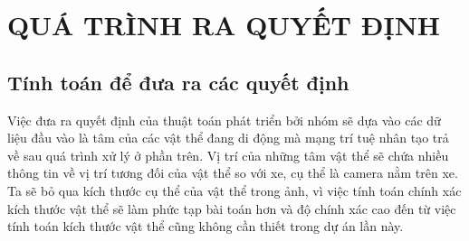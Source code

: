 \chapter {QUÁ TRÌNH RA QUYẾT ĐỊNH}


\section{Tính toán để đưa ra các quyết định}
	Việc đưa ra quyết định của thuật toán phát triển bởi nhóm sẽ dựa vào các dữ liệu đầu vào là tâm của các vật thể đang di động mà mạng trí tuệ nhân tạo trả về sau quá trình xử lý ở phần trên. Vị trí của những tâm vật thể sẽ chứa nhiều thông tin về vị trí tương đối của vật thể so với xe, cụ thể là camera nằm trên xe. Ta sẽ bỏ qua kích thước cụ thể của vật thể trong ảnh, vì việc tính toán chính xác kích thước vật thể sẽ làm phức tạp bài toán hơn và độ chính xác cao đến từ việc tính toán kích thước vật thể cũng không cần thiết trong dự án lần này.

